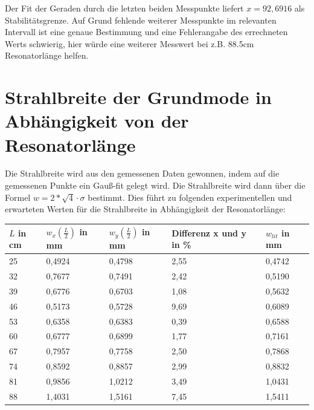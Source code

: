 \documentclass[bigchapter,colorback,accentcolor=tud4b,linedtoc,11pt]{tudreport}
\numberwithin{equation}{subsection}
\begin{document}
Der Fit der Geraden durch die letzten beiden Messpunkte liefert $x=92,6916$ als Stabilitätsgrenze. Auf Grund fehlende weiterer Messpunkte im relevanten Intervall ist eine genaue Bestimmung und eine Fehlerangabe des errechneten Werts schwierig, hier würde eine weiterer Messwert bei z.B. 88.5cm Resonatorlänge helfen.
\section{Strahlbreite der Grundmode in Abhängigkeit von der Resonatorlänge}
Die Strahlbreite wird aus den gemessenen Daten gewonnen, indem auf die gemessenen Punkte ein Gauß-fit gelegt wird. Die Strahlbreite wird dann über die Formel
$w=2*\sqrt{4}\cdot\sigma$
bestimmt. Dies führt zu folgenden experimentellen und erwarteten Werten für die Strahlbreite in Abhängigkeit der Resonatorlänge:
\begin{center}
    \begin{tabular}{ | l | l | l | l | p{4cm} |}
    \hline
    $L$ in cm & $w_x\left(\frac{L}{2}\right)$ in mm & $w_y\left(\frac{L}{2}\right)$ in mm & Differenz x und y in \% & $w_{lit}$ in mm \\ \hline
    25 & 0,4924 & 0,4798 & 2,55 & 0,4742 \\ \hline
    32 & 0,7677 & 0,7491 & 2,42 & 0,5190 \\ \hline
    39 & 0,6776 & 0,6703 & 1,08 & 0,5632 \\ \hline
    46 & 0,5173 & 0,5728 & 9,69 & 0,6089 \\ \hline
    53 & 0,6358 & 0,6383 & 0,39 & 0,6588 \\ \hline
    60 & 0,6777 & 0,6899 & 1,77 & 0,7161 \\ \hline
    67 & 0,7957 & 0,7758 & 2,50 & 0,7868 \\ \hline
    74 & 0,8592 & 0,8857 & 2,99 & 0,8832 \\ \hline
    81 & 0,9856 & 1,0212 & 3,49 & 1,0431 \\ \hline
    88 & 1,4031 & 1,5161 & 7,45 & 1,5411 \\ \hline
    \end{tabular}
\end{center}
\end{document}
